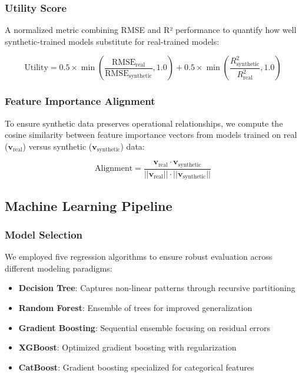 \documentclass[conference]{IEEEtran}
\begin{document}
\subsubsection{Utility Score}
A normalized metric combining RMSE and R² performance to quantify how well synthetic-trained models substitute for real-trained models:

\begin{equation}
\text{Utility} = 0.5 \times \min\left(\frac{\text{RMSE}_{\text{real}}}{\text{RMSE}_{\text{synthetic}}}, 1.0\right) + 0.5 \times \min\left(\frac{R^2_{\text{synthetic}}}{R^2_{\text{real}}}, 1.0\right)
\end{equation}

\subsubsection{Feature Importance Alignment}
To ensure synthetic data preserves operational relationships, we compute the cosine similarity between feature importance vectors from models trained on real ($\mathbf{v}_{\text{real}}$) versus synthetic ($\mathbf{v}_{\text{synthetic}}$) data:

\begin{equation}
\text{Alignment} = \frac{\mathbf{v}_{\text{real}} \cdot \mathbf{v}_{\text{synthetic}}}{||\mathbf{v}_{\text{real}}|| \cdot ||\mathbf{v}_{\text{synthetic}}||}
\end{equation}

\subsection{Machine Learning Pipeline}

\subsubsection{Model Selection}
We employed five regression algorithms to ensure robust evaluation across different modeling paradigms:
\begin{itemize}
    \item \textbf{Decision Tree}: Captures non-linear patterns through recursive partitioning
    \item \textbf{Random Forest}: Ensemble of trees for improved generalization
    \item \textbf{Gradient Boosting}: Sequential ensemble focusing on residual errors
    \item \textbf{XGBoost}: Optimized gradient boosting with regularization
    \item \textbf{CatBoost}: Gradient boosting specialized for categorical features
\end{itemize}
\end{document}
